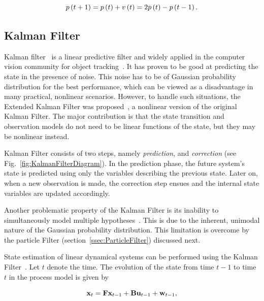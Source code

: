 \begin{equation}
    \label{eq:TrivialMotionModel}
    {p} \left( t + 1 \right) = {p} \left( t \right) + {v} \left( t \right) = 2{p} \left( t \right) - {p} \left( t - 1 \right).
\end{equation}

\subsection{Kalman Filter}
\label{ssec:KalmanFiler}

Kalman filter~\cite{Kalman1960, welch1995introduction} is a linear predictive filter and widely applied in the computer vision community for object tracking~\cite{Jalal2012}. It has proven to be good at predicting the state in the presence of noise. This noise has to be of Gaussian probability distribution for the best performance, which can be viewed as a disadvantage in many practical, nonlinear scenarios. However, to handle such situations, the Extended Kalman Filter was proposed~\cite{welch1995introduction}, a nonlinear version of the original Kalman Filter. The major contribution is that the state transition and observation models do not need to be linear functions of the state, but they may be nonlinear instead.

Kalman Filter consists of two steps, namely \emph{prediction}, and \emph{correction} (see Fig.~\ref{fig:KalmanFilterDiagram}). In the prediction phase, the future system's state is predicted using only the variables describing the previous state. Later on, when a new observation is made, the correction step ensues and the internal state variables are updated accordingly.

Another problematic property of the Kalman Filter is its inability to simultaneously model multiple hypotheses~\cite{welch1995introduction}. This is due to the inherent, unimodal nature of the Gaussian probability distribution. This limitation is overcome by the particle Filter (section~\ref{ssec:ParticleFilter}) discussed next.

State estimation of linear dynamical systems can be performed using the Kalman Filter~\cite{kim2018introduction}. Let $t$ denote the time. The evolution of the state from time $t - 1$ to time $t$ in the process model is given by

\begin{equation}
    \mathbf{x}_t = \mathbf{F} \mathbf{x}_{t - 1} + \mathbf{B} \mathbf{u}_{t - 1} + \mathbf{w}_{t - 1},
\end{equation}

